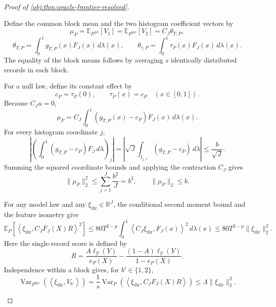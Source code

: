 \documentclass[11pt]{article}
\begin{document}
\begin{proof}[Proof of \cref{obj:thm:oracle-frontier-resolved}]
\begin{enumerate}
Define the common block mean and the two histogram coefficient vectors by
\[
\mu_P=\mathbb E_{P^{\otimes n}}[V_1]
=\mathbb E_{P^{\otimes n}}[V_2]
=C_J\theta_{T,P},
\]
\[
\theta_{T,P}=\int_0^1g_{T,P}(x)F_J(x)\,d\lambda(x),
\qquad
\theta_{\tau,P}=\int_0^1\tau_P(x)F_J(x)\,d\lambda(x).
\]
The equality of the block means follows by averaging \(s\) identically distributed records in each block.

For a null law, define its constant effect by
\[
c_P=\tau_P(0),\qquad \tau_P(x)=c_P\quad(x\in[0,1]).
\]
Because \(C_Ju=0\),
\[
\mu_P=C_J\int_0^1(g_{T,P}(x)-c_P)F_J(x)\,d\lambda(x).
\]
For every histogram coordinate \(j\),
\[
\left|
\left(\int_0^1(g_{T,P}-c_P)F_J\,d\lambda\right)_j
\right|
=
\left|\sqrt J\int_{I_{j,J}}(g_{T,P}-c_P)\,d\lambda\right|
\le\frac b{\sqrt J}.
\]
Summing the squared coordinate bounds and applying the contraction \(C_J\) gives
\[
\|\mu_P\|_2^2
\le\sum_{j=1}^{J}\frac{b^2}{J}=b^2,
\qquad
\|\mu_P\|_2\le b.
\]

For any model law and any \(\xi_{\mathrm{dir}}\in\mathbb R^J\), the conditional second moment bound and the feature isometry give
\[
\mathbb E_P\!\left[
\left\langle\xi_{\mathrm{dir}},C_JF_J(X)R\right\rangle^2
\right]
\le80T^{2-p}\int_0^1
\left\langle C_J\xi_{\mathrm{dir}},F_J(x)\right\rangle^2\,d\lambda(x)
\le80T^{2-p}\|\xi_{\mathrm{dir}}\|_2^2.
\]
Here the single-record score is defined by
\[
R=\frac{A\ell_T(Y)}{e_P(X)}
-\frac{(1-A)\ell_T(Y)}{1-e_P(X)}.
\]
Independence within a block gives, for \(b'\in\{1,2\}\),
\[
\operatorname{Var}_{P^{\otimes n}}
\!\left(\left\langle\xi_{\mathrm{dir}},V_{b'}\right\rangle\right)
=
\frac1s\operatorname{Var}_P
\!\left(\left\langle\xi_{\mathrm{dir}},C_JF_J(X)R\right\rangle\right)
\le\Lambda\|\xi_{\mathrm{dir}}\|_2^2.
\]


\end{enumerate}
\end{proof}
\end{document}
